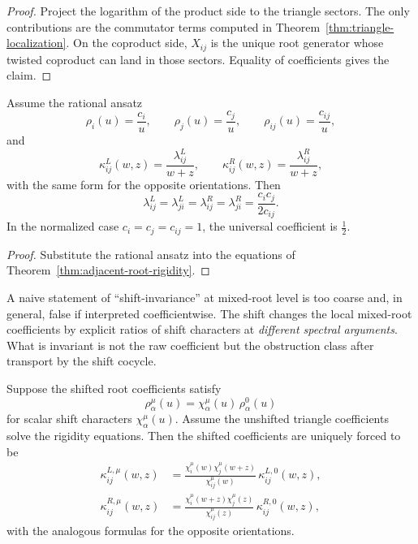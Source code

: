 \begin{proof}
Project the logarithm of the product side to the triangle sectors.
The only contributions are the commutator terms computed in
Theorem~\ref{thm:triangle-localization}. On the coproduct side,
$X_{ij}$ is the unique root generator whose twisted coproduct can land in
those sectors. Equality of coefficients gives the claim.
\end{proof}

\begin{corollary}
\ClaimStatusProvedHere
Assume the rational ansatz
\[
\rho_i(u)=\frac{c_i}{u},
\qquad
\rho_j(u)=\frac{c_j}{u},
\qquad
\rho_{ij}(u)=\frac{c_{ij}}{u},
\]
and
\[
\kappa_{ij}^{L}(w,z)=\frac{\lambda_{ij}^{L}}{w+z},
\qquad
\kappa_{ij}^{R}(w,z)=\frac{\lambda_{ij}^{R}}{w+z},
\]
with the same form for the opposite orientations. Then
\[
\lambda_{ij}^{L}=
\lambda_{ji}^{L}=
\lambda_{ij}^{R}=
\lambda_{ji}^{R}=
\frac{c_ic_j}{2c_{ij}}.
\]
In the normalized case $c_i=c_j=c_{ij}=1$, the universal coefficient is
$\frac12$.
\end{corollary}

\begin{proof}
Substitute the rational ansatz into the equations of
Theorem~\ref{thm:adjacent-root-rigidity}.
\end{proof}

\begin{remark}
\label{rem:transport-not-invariance}
A naive statement of ``shift-invariance'' at mixed-root level is too
coarse and, in general, false if interpreted coefficientwise. The shift
changes the local mixed-root coefficients by explicit ratios of shift
characters at \emph{different spectral arguments}. What is invariant is
not the raw coefficient but the obstruction class after transport by the
shift cocycle.
\end{remark}

\begin{proposition}
\ClaimStatusProvedHere
\label{prop:triangle-shift-transport}
Suppose the shifted root coefficients satisfy
\[
\rho_\alpha^{\mu}(u)=\chi_\alpha^{\mu}(u)\,\rho_\alpha^{0}(u)
\]
for scalar shift characters $\chi_\alpha^{\mu}(u)$.
Assume the unshifted triangle coefficients solve the rigidity equations.
Then the shifted coefficients are uniquely forced to be
\begin{align*}
\kappa_{ij}^{L,\mu}(w,z)
&=
\frac{\chi_i^{\mu}(w)\chi_j^{\mu}(w+z)}{\chi_{ij}^{\mu}(w)}
\,\kappa_{ij}^{L,0}(w,z),\\
\kappa_{ij}^{R,\mu}(w,z)
&=
\frac{\chi_i^{\mu}(w+z)\chi_j^{\mu}(z)}{\chi_{ij}^{\mu}(z)}
\,\kappa_{ij}^{R,0}(w,z),
\end{align*}
with the analogous formulas for the opposite orientations.
\end{proposition}

